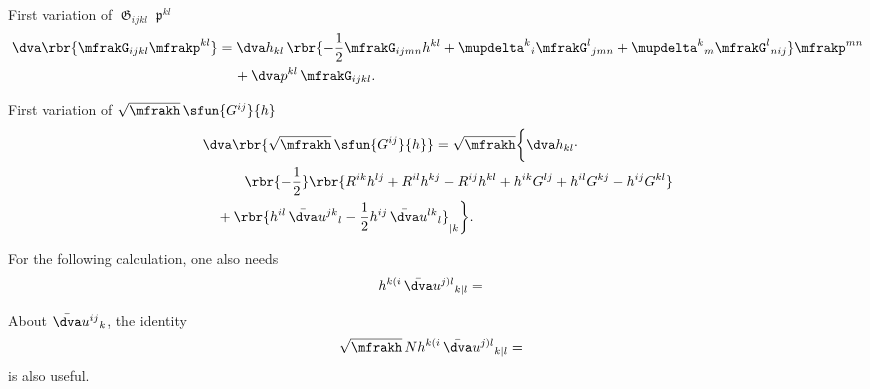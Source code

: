 \documentclass[a4paper,11pt]{article}
\begin{document}
First variation of $\mfrakG_{ijkl}\mfrakp^{kl}$
\begin{align}
\dva\rbr{\mfrakG_{ijkl}\mfrakp^{kl}} &= \dva h_{kl}\,
\rbr{-\frac{1}{2}\mfrakG_{ijmn}h^{kl}+
\mupdelta^{k}{}_{i}\mfrakG^{l}{}_{jmn}+
\mupdelta^{k}{}_{m}\mfrakG^{l}{}_{nij}}\mfrakp^{mn}
\nonumber \\
&\quad\,
+\dva p^{kl}\,\mfrakG_{ijkl}.
\end{align}

First variation of $\sqrt{\mfrakh}\,\sfun{G^{ij}}{h}$
\begin{align}
&
\dva\rbr{\sqrt{\mfrakh}\,\sfun{G^{ij}}{h}}
= \sqrt{\mfrakh}\bigg\{\dva h_{kl}\cdot
\nonumber \\
&\qquad\quad
\rbr{-\frac{1}{2}}\rbr{
R^{ik}h^{lj}+R^{il}h^{kj}-R^{ij}h^{kl}+h^{ik}G^{lj}+h^{il}G^{kj}-h^{ij}G^{kl}}
\nonumber \\
&\quad
+\rbr{h^{il}\,\bar{\dva}u^{jk}{}_{l}
- \frac{1}{2}h^{ij}\,\bar{\dva}u^{lk}{}_{l}}_{|k} \bigg\}.
\end{align}

For the following calculation, one also needs
\begin{align}
h^{k(i}\,\bar{\dva}u^{j)l}{}_{k|l} &=
\end{align}



About $\bar{\dva}u^{ij}{}_{k}$, the identity
\begin{align}
&
\sqrt{\mfrakh}\,N h^{k(i}\,\bar{\dva}u^{j)l}{}_{k|l} =
\end{align}
is also useful.

\end{document}

